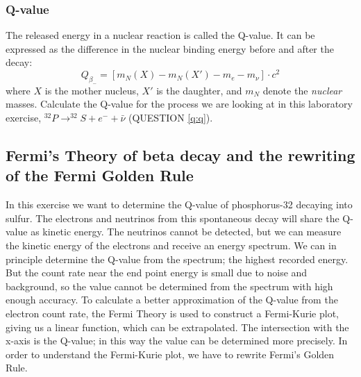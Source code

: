 \documentclass[a4,11pt, notitlepage]{article}
\begin{document}
\pagebreak
\subsubsection{Q-value}

The released energy in a nuclear reaction is called the Q-value. It can be expressed as the difference in the nuclear binding energy before and after the decay: \begin{equation}
  Q_{\beta_-}=[m_{N}(X)-m_{N}(X')-m_e-m_{\nu}]\cdot c^2
\end{equation}
where $X$ is the mother nucleus, $X'$ is the daughter, and $m_N$ denote the \textit{nuclear} masses. Calculate the Q-value for the process we are looking at in this laboratory exercise, $^{32}P\rightarrow ^{32}S + e^- + \bar{\nu}$ (QUESTION \ref{q:q}). 


%
%
%


\subsection{Fermi's Theory of beta decay and the rewriting of the Fermi Golden Rule}

In this exercise we want to determine the Q-value of phosphorus-32 decaying into sulfur. The electrons and neutrinos from this spontaneous decay will share the Q-value as kinetic energy. The neutrinos cannot be detected, but we can measure the kinetic energy of the electrons and receive an energy spectrum. We can in principle determine the Q-value from the spectrum; the highest recorded energy. But the count rate near the end point energy is small due to noise and background, so the value cannot be determined from the spectrum with high enough accuracy. To calculate a better approximation of the Q-value from the electron count rate, the Fermi Theory is used to construct a Fermi-Kurie plot, giving us a linear function, which can be extrapolated. The intersection with the x-axis is the Q-value; in this way the value can be determined more precisely. In order to understand the Fermi-Kurie plot, we have to rewrite Fermi's Golden Rule.
\end{document}
